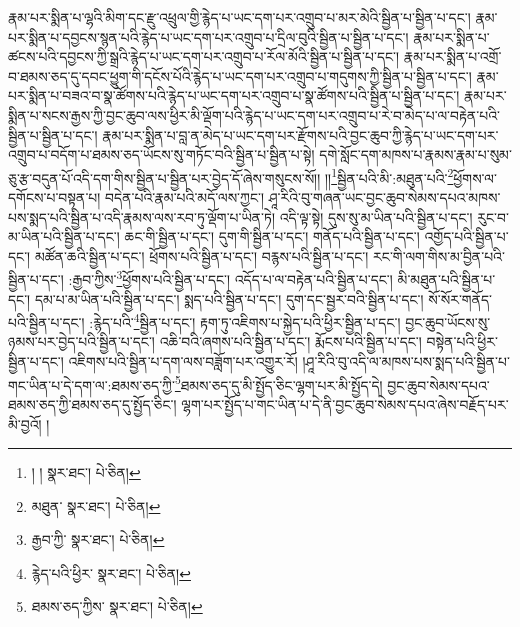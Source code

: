 རྣམ་པར་སྨིན་པ་ལྷའི་མིག་དང་རྫུ་འཕྲུལ་གྱི་རྙེད་པ་ཡང་དག་པར་འགྲུབ་པ་མར་མེའི་སྦྱིན་པ་སྦྱིན་པ་དང་། རྣམ་པར་སྨིན་པ་དབྱངས་སྙན་པའི་རྙེད་པ་ཡང་དག་པར་འགྲུབ་པ་དྲིལ་བུའི་སྦྱིན་པ་སྦྱིན་པ་དང་། རྣམ་པར་སྨིན་པ་ཚངས་པའི་དབྱངས་ཀྱི་སྒྲའི་རྙེད་པ་ཡང་དག་པར་འགྲུབ་པ་རོལ་མོའི་སྦྱིན་པ་སྦྱིན་པ་དང་། རྣམ་པར་སྨིན་པ་འགྲོ་བ་ཐམས་ཅད་དུ་དབང་ཕྱུག་གི་དངོས་པོའི་རྙེད་པ་ཡང་དག་པར་འགྲུབ་པ་གདུགས་ཀྱི་སྦྱིན་པ་སྦྱིན་པ་དང་། རྣམ་པར་སྨིན་པ་བཟའ་བ་སྣ་ཚོགས་པའི་རྙེད་པ་ཡང་དག་པར་འགྲུབ་པ་སྣ་ཚོགས་པའི་སྦྱིན་པ་སྦྱིན་པ་དང་། རྣམ་པར་སྨིན་པ་སངས་རྒྱས་ཀྱི་བྱང་ཆུབ་ལས་ཕྱིར་མི་ལྡོག་པའི་རྙེད་པ་ཡང་དག་པར་འགྲུབ་པ་རེ་བ་མེད་པ་ལ་བརྟེན་པའི་སྦྱིན་པ་སྦྱིན་པ་དང་། རྣམ་པར་སྨིན་པ་བླ་ན་མེད་པ་ཡང་དག་པར་རྫོགས་པའི་བྱང་ཆུབ་ཀྱི་རྙེད་པ་ཡང་དག་པར་འགྲུབ་པ་བདོག་པ་ཐམས་ཅད་ཡོངས་སུ་གཏོང་བའི་སྦྱིན་པ་སྦྱིན་པ་སྟེ། དགེ་སློང་དག་མཁས་པ་རྣམས་རྣམ་པ་སུམ་ཅུ་རྩ་བདུན་པོ་འདི་དག་གིས་སྦྱིན་པ་སྦྱིན་པར་བྱེད་དོ་ཞེས་གསུངས་སོ།། །།\footnote{། །  སྣར་ཐང་།  པེ་ཅིན། }སྦྱིན་པའི་མི་:མཐུན་པའི་\footnote{མཐུན་  སྣར་ཐང་།  པེ་ཅིན། }ཕྱོགས་ལ་དགོངས་པ་བསྟན་པ། བདེན་པའི་རྣམ་པའི་མདོ་ལས་ཀྱང་། ཤཱ་རིའི་བུ་གཞན་ཡང་བྱང་ཆུབ་སེམས་དཔའ་མཁས་པས་སྨད་པའི་སྦྱིན་པ་འདི་རྣམས་ལས་རབ་ཏུ་ལྡོག་པ་ཡིན་ཏེ། འདི་ལྟ་སྟེ། དུས་སུ་མ་ཡིན་པའི་སྦྱིན་པ་དང་། རུང་བ་མ་ཡིན་པའི་སྦྱིན་པ་དང་། ཆང་གི་སྦྱིན་པ་དང་། དུག་གི་སྦྱིན་པ་དང་། གནོད་པའི་སྦྱིན་པ་དང་། འགྱོད་པའི་སྦྱིན་པ་དང་། མཚོན་ཆའི་སྦྱིན་པ་དང་། ཕྲོགས་པའི་སྦྱིན་པ་དང་། བརྙས་པའི་སྦྱིན་པ་དང་། རང་གི་ལག་གིས་མ་བྱིན་པའི་སྦྱིན་པ་དང་། :རྒྱབ་ཀྱིས་\footnote{རྒྱབ་ཀྱི་  སྣར་ཐང་།  པེ་ཅིན། }ཕྱོགས་པའི་སྦྱིན་པ་དང་། འདོད་པ་ལ་བརྟེན་པའི་སྦྱིན་པ་དང་། མི་མཐུན་པའི་སྦྱིན་པ་དང་། དམ་པ་མ་ཡིན་པའི་སྦྱིན་པ་དང་། སྨད་པའི་སྦྱིན་པ་དང་། དུག་དང་སྦྱར་བའི་སྦྱིན་པ་དང་། སོ་སོར་གནོད་པའི་སྦྱིན་པ་དང་། :རྙེད་པའི་\footnote{རྙེད་པའི་ཕྱིར་  སྣར་ཐང་།  པེ་ཅིན། }སྦྱིན་པ་དང་། རྟག་ཏུ་འཇིགས་པ་སྐྱེད་པའི་ཕྱིར་སྦྱིན་པ་དང་། བྱང་ཆུབ་ཡོངས་སུ་ཉམས་པར་བྱེད་པའི་སྦྱིན་པ་དང་། འཆི་བའི་ཞགས་པའི་སྦྱིན་པ་དང་། རྨོངས་པའི་སྦྱིན་པ་དང་། བསྟེན་པའི་ཕྱིར་སྦྱིན་པ་དང་། འཇིགས་པའི་སྦྱིན་པ་དག་ལས་བཟློག་པར་འགྱུར་རོ། །ཤཱ་རིའི་བུ་འདི་ལ་མཁས་པས་སྨད་པའི་སྦྱིན་པ་གང་ཡིན་པ་དེ་དག་ལ་:ཐམས་ཅད་ཀྱི་\footnote{ཐམས་ཅད་ཀྱིས་  སྣར་ཐང་།  པེ་ཅིན། }ཐམས་ཅད་དུ་མི་སྤྱོད་ཅིང་ལྷག་པར་མི་སྤྱོད་དེ། བྱང་ཆུབ་སེམས་དཔའ་ཐམས་ཅད་ཀྱི་ཐམས་ཅད་དུ་སྤྱོད་ཅིང་། ལྷག་པར་སྤྱོད་པ་གང་ཡིན་པ་དེ་ནི་བྱང་ཆུབ་སེམས་དཔའ་ཞེས་བརྗོད་པར་མི་བྱའོ། །
